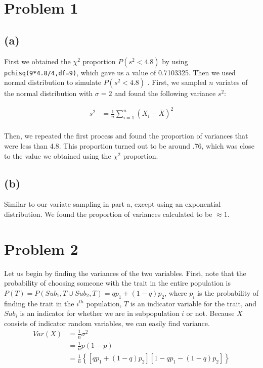 \documentclass{article}
\begin{document}
\thispagestyle{fancy}

\section*{Problem 1}
\subsection*{(a)}

First we obtained the $\chi^{2}$ proportion $P(s^{2} < 4.8)$ by using \verb+pchisq(9*4.8/4,df=9)+, which gave us a value of 0.7103325. Then we used normal distribution to simulate $P( s^{2} < 4.8 )$ . First, we sampled $n$ variates of the normal distribution with $\sigma = 2$ and found the following variance $s^{2}$:

\begin{align*}
  s^2 &= \frac{1}{n} \displaystyle\sum\limits_{i=1}^n (X_{i}- \bar{X})^{2} \\
\end{align*}

Then, we repeated the first process and found the proportion of variances that were less than 4.8. This proportion turned out to be around .76, which was close to the value we obtained using the $\chi^{2}$ proportion.

\subsection*{(b)}

Similar to our variate sampling in part a, except using an exponential distribution. We found the proportion of variances calculated to be $\approx 1$.

\section*{Problem 2}

Let us begin by finding the variances of the two variables. First, note that
the probability of choosing someone with the trait in the entire population is
$P(T) = P(Sub_1,T\cup Sub_2,T) = qp_1 + ( 1 - q )p_2$, where $p_i$ is the
probability of finding the trait in the $i^{th}$ population, $T$ is an indicator
variable for the trait, and $Sub_i$ is an indicator for whether we are in
subpopulation $i$ or not. Because $X$ consists of indicator random variables,
we can easily find variance.
\begin{align*}
  Var(X) &= \frac{1}{n}\sigma^2 \\
         &= \frac{1}{n}p(1-p) \\
         &= \frac{1}{n}\left\{[qp_1 + (1-q)p_2][1 - qp_1 - (1-q)p_2]\right\}
\end{align*}
\end{document}
